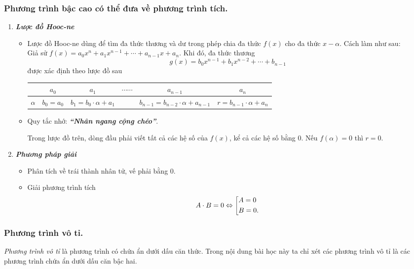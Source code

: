 \subsubsection{Phương trình bậc cao có thể đưa về phương trình tích.}
\begin{enumerate}
	\item \textbf{\textit{Lược đồ Hooc-ne}}
	\begin{itemize}
		\item Lược đồ Hooc-ne dùng để tìm đa thức thương và dư trong phép chia đa thức $f(x)$ cho đa thức $x-\alpha$. Cách làm như sau:\\		
		Giả sử $f(x)=a_0x^n+a_1x^{n-1}+\cdots +a_{n-1}x+a_n$. Khi đó, đa thức thương $$g(x)=b_0x^{n-1}+b_1x^{n-2}+\cdots +b_{n-1}$$
		được xác định theo lược đồ sau
		\begin{center}
			\begin{tabular}{|c|c|c|c|c|c|}
				\hline
			 	&$a_0$ &$a_1$ &$\cdots\cdots$ &$a_{n-1}$ &$a_n$\\
			\hline
			$\alpha$ &$b_0=a_0$ &$b_1=b_0\cdot\alpha +a_1$ &  &$b_{n-1}=b_{n-2}\cdot\alpha+a_{n-1}$ &$r=b_{n-1}\cdot\alpha+a_n$\\
			\hline
			\end{tabular}
		\end{center}
		\item Quy tắc nhớ: \textbf{\textit{``Nhân ngang cộng chéo''}}.
		\begin{note}
			Trong lược đồ trên, dòng đầu phải viết tất cả các hệ số của $f(x)$, kể cả các hệ số bằng $0$. Nếu $f(\alpha)=0$ thì $r=0$.
		\end{note}
	\end{itemize}
	\item \textbf{\textit{Phương pháp giải}}
	\begin{itemize}
		\item Phân tích về trái thành nhân tử, vế phải bằng $0$.
		\item Giải phương trình tích $$A\cdot B=0 \Leftrightarrow \left[\begin{aligned}&A=0\\ &B=0.\end{aligned}\right.$$
	\end{itemize}
\end{enumerate}

\subsubsection{Phương trình vô tỉ.}
 \textit{Phương trình vô tỉ} là phương trình có chứa ẩn dưới dấu căn thức.
Trong nội dung bài học này ta chỉ xét các phương trình vô tỉ là các phương trình chứa ẩn dưới dấu căn bậc hai.
